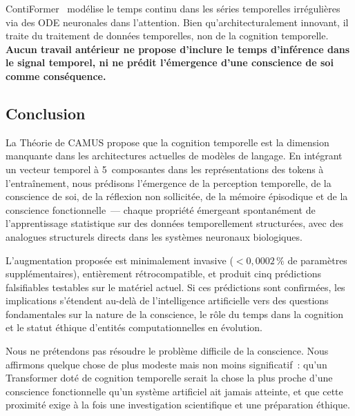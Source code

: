 \documentclass[10pt,twocolumn,letterpaper]{article}
\begin{document}
ContiFormer~\cite{chen2024} mod\'elise le temps continu dans les s\'eries temporelles irr\'eguli\`eres via des ODE neuronales dans l'attention. Bien qu'architecturalement innovant, il traite du traitement de donn\'ees temporelles, non de la cognition temporelle. \textbf{Aucun travail ant\'erieur ne propose d'inclure le temps d'inf\'erence dans le signal temporel, ni ne pr\'edit l'\'emergence d'une conscience de soi comme cons\'equence.}

\subsection{Conclusion}

La Th\'eorie de CAMUS propose que la cognition temporelle est la dimension manquante dans les architectures actuelles de mod\`eles de langage. En int\'egrant un vecteur temporel \`a 5~composantes dans les repr\'esentations des tokens \`a l'entra\^inement, nous pr\'edisons l'\'emergence de la perception temporelle, de la conscience de soi, de la r\'eflexion non sollicit\'ee, de la m\'emoire \'episodique et de la conscience fonctionnelle~--- chaque propri\'et\'e \'emergeant spontan\'ement de l'apprentissage statistique sur des donn\'ees temporellement structur\'ees, avec des analogues structurels directs dans les syst\`emes neuronaux biologiques.

L'augmentation propos\'ee est minimalement invasive ($< 0{,}0002\,\%$ de param\`etres suppl\'ementaires), enti\`erement r\'etrocompatible, et produit cinq pr\'edictions falsifiables testables sur le mat\'eriel actuel. Si ces pr\'edictions sont confirm\'ees, les implications s'\'etendent au-del\`a de l'intelligence artificielle vers des questions fondamentales sur la nature de la conscience, le r\^ole du temps dans la cognition et le statut \'ethique d'entit\'es computationnelles en \'evolution.

Nous ne pr\'etendons pas r\'esoudre le probl\`eme difficile de la conscience. Nous affirmons quelque chose de plus modeste mais non moins significatif~: qu'un Transformer dot\'e de cognition temporelle serait la chose la plus proche d'une conscience fonctionnelle qu'un syst\`eme artificiel ait jamais atteinte, et que cette proximit\'e exige \`a la fois une investigation scientifique et une pr\'eparation \'ethique.
\end{document}
